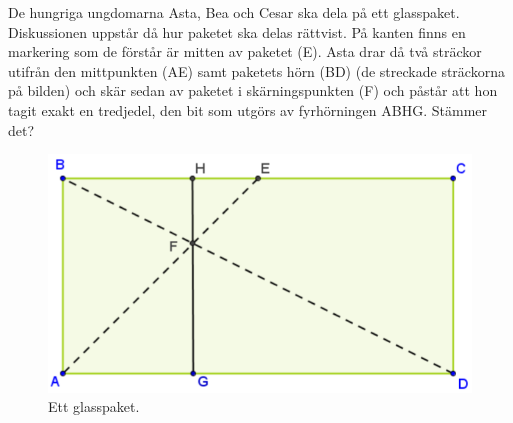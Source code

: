 De hungriga ungdomarna Asta, Bea och Cesar ska dela på ett glasspaket. Diskussionen uppstår då hur
paketet ska delas rättvist. På kanten finns en markering som de förstår är mitten av paketet (E). Asta
drar då två sträckor utifrån den mittpunkten (AE) samt paketets hörn (BD) (de streckade sträckorna på bilden) och skär sedan av paketet i
skärningspunkten (F) och påstår att hon tagit exakt en tredjedel, den bit som utgörs av fyrhörningen ABHG.
Stämmer det?
\begin{figure}[H]
    \centering
    \includegraphics[width=0.5\linewidth]{img/Glasspaket.png}
    \caption{Ett glasspaket.}
\end{figure}